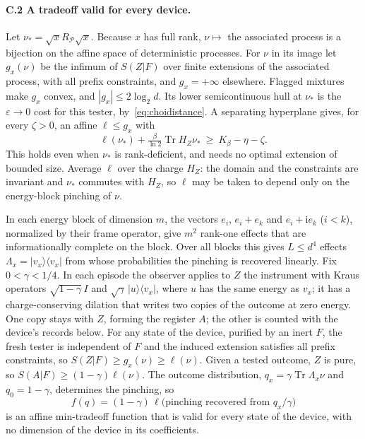 \documentclass[11pt]{article}
\theoremstyle{definition}
\theoremstyle{remark}
\newcommand{\Tr}{\operatorname{Tr}}
\newcommand{\Kb}{K_\beta}
\newcommand{\Pp}{\mathcal P}
\begin{document}
\paragraph{C.2 A tradeoff valid for every device.} Let $\nu_*=\sqrt xR_\Pp\sqrt x$. Because $x$ has full rank, $\nu\mapsto$ the associated process is a bijection on the affine space of deterministic processes. For $\nu$ in its image let $g_x(\nu)$ be the infimum of $S(Z|F)$ over finite extensions of the associated process, with all prefix constraints, and $g_x=+\infty$ elsewhere. Flagged mixtures make $g_x$ convex, and $|g_x|\le2\log_2d$. Its lower semicontinuous hull at $\nu_*$ is the $\varepsilon\to0$ cost for this tester, by~\eqref{eq:choidistance}. A separating hyperplane gives, for every $\zeta>0$, an affine $\ell\le g_x$ with
\[
\ell(\nu_*)+\tfrac{\beta}{\ln2}\Tr H_Z\nu_*\ \ge\ \Kb-\eta-\zeta.
\]
This holds even when $\nu_*$ is rank-deficient, and needs no optimal extension of bounded size. Average $\ell$ over the charge $H_Z$: the domain and the constraints are invariant and $\nu_*$ commutes with $H_Z$, so $\ell$ may be taken to depend only on the energy-block pinching of $\nu$.

In each energy block of dimension $m$, the vectors $e_i$, $e_i+e_k$ and $e_i+\mathrm ie_k$ ($i<k$), normalized by their frame operator, give $m^2$ rank-one effects that are informationally complete on the block. Over all blocks this gives $L\le d^4$ effects $\Lambda_x=|v_x\rangle\langle v_x|$ from whose probabilities the pinching is recovered linearly. Fix $0<\gamma<1/4$. In each episode the observer applies to $Z$ the instrument with Kraus operators $\sqrt{1-\gamma}\,I$ and $\sqrt\gamma\,|u\rangle\langle v_x|$, where $u$ has the same energy as $v_x$; it has a charge-conserving dilation that writes two copies of the outcome at zero energy. One copy stays with $Z$, forming the register $A$; the other is counted with the device's records below. For any state of the device, purified by an inert $F$, the fresh tester is independent of $F$ and the induced extension satisfies all prefix constraints, so $S(Z|F)\ge g_x(\nu)\ge\ell(\nu)$. Given a tested outcome, $Z$ is pure, so $S(A|F)\ge(1-\gamma)\ell(\nu)$. The outcome distribution, $q_x=\gamma\Tr\Lambda_x\nu$ and $q_0=1-\gamma$, determines the pinching, so
\[
f(q)=(1-\gamma)\,\ell\bigl(\text{pinching recovered from }q_x/\gamma\bigr)
\]
is an affine min-tradeoff function that is valid for every state of the device, with no dimension of the device in its coefficients.
\end{document}
